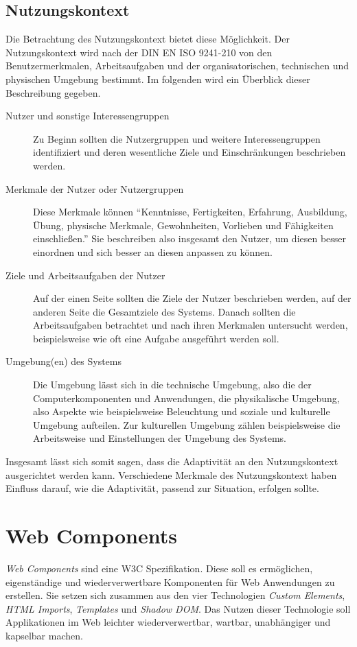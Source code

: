 \documentclass[12pt, paper=a4, bibtotoc, toc=listof, headsepline=true]{scrreprt}
\begin{document}
	\section{Nutzungskontext}
	Die Betrachtung des Nutzungskontext bietet diese Möglichkeit. Der Nutzungskontext wird nach der DIN EN ISO 9241-210 von den Benutzermerkmalen, Arbeitsaufgaben und der organisatorischen, technischen und physischen Umgebung bestimmt. Im folgenden wird ein Überblick dieser Beschreibung gegeben.\cite[vgl. S.15 ff.]{hoffmann2014venus}
	\begin{description}  
		\item  [Nutzer und sonstige Interessengruppen] 
		Zu Beginn sollten die Nutzergruppen und weitere Interessengruppen identifiziert und deren wesentliche Ziele und Einschränkungen beschrieben werden.
			
		\item [Merkmale der Nutzer oder Nutzergruppen]
		Diese Merkmale können \enquote{Kenntnisse, Fertigkeiten, Erfahrung, Ausbildung, Übung, physische Merkmale, Gewohnheiten, Vorlieben und Fähigkeiten einschließen.}\cite[S.16 ]{hoffmann2014venus} Sie beschreiben also insgesamt den Nutzer, um diesen besser einordnen und sich besser an diesen anpassen zu können.
		
		\item  [Ziele und Arbeitsaufgaben der Nutzer]
		Auf der einen Seite sollten die Ziele der Nutzer beschrieben werden, auf der anderen Seite die Gesamtziele des Systems. Danach sollten die Arbeitsaufgaben betrachtet und nach ihren Merkmalen untersucht werden, beispielsweise wie oft eine Aufgabe ausgeführt werden soll.
			
		\item [Umgebung(en) des Systems]
		Die Umgebung lässt sich in die technische Umgebung, also die der Computerkomponenten und Anwendungen, die physikalische Umgebung, also Aspekte wie beispielsweise Beleuchtung und soziale und kulturelle Umgebung aufteilen. Zur kulturellen Umgebung zählen beispielsweise die Arbeitsweise und Einstellungen der Umgebung des Systems.
	\end{description}
	Insgesamt lässt sich somit sagen, dass die Adaptivität an den Nutzungskontext ausgerichtet werden kann. Verschiedene Merkmale des Nutzungskontext haben Einfluss darauf, wie die Adaptivität, passend zur Situation, erfolgen sollte.
		
\chapter{Web Components}
	\emph{Web Components} sind eine \ac{W3C} Spezifikation. Diese soll es ermöglichen, eigenständige und wiederverwertbare Komponenten für Web Anwendungen zu erstellen. \cite[vgl. S. 1]{patel2015learning} Sie setzen sich zusammen aus den vier Technologien \emph{Custom Elements}, \emph{\ac{HTML} Imports}, \emph{Templates} und \emph{Shadow \ac{DOM}}. Das Nutzen dieser Technologie soll Applikationen im Web leichter wiederverwertbar, wartbar, unabhängiger und kapselbar machen.\cite[vgl. S.2]{patel2015learning}
\end{document}
